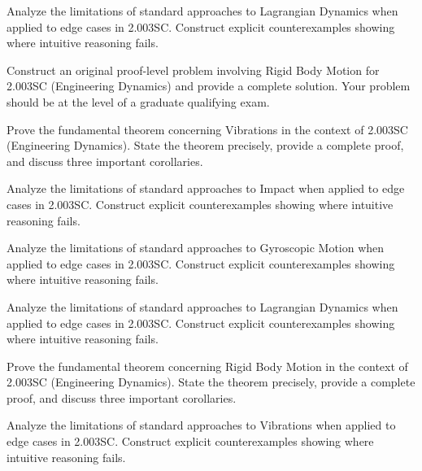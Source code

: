 \documentclass[12pt,a4paper]{exam}
\begin{document}
\begin{questions}

\question[5]
Analyze the limitations of standard approaches to Lagrangian Dynamics when applied to edge cases in 2.003SC. Construct explicit counterexamples showing where intuitive reasoning fails.

\vspace{0.3cm}

\question[5]
Construct an original proof-level problem involving Rigid Body Motion for 2.003SC (Engineering Dynamics) and provide a complete solution. Your problem should be at the level of a graduate qualifying exam.

\vspace{0.3cm}

\question[3]
Prove the fundamental theorem concerning Vibrations in the context of 2.003SC (Engineering Dynamics). State the theorem precisely, provide a complete proof, and discuss three important corollaries.

\vspace{0.3cm}

\question[2]
Analyze the limitations of standard approaches to Impact when applied to edge cases in 2.003SC. Construct explicit counterexamples showing where intuitive reasoning fails.

\vspace{0.3cm}

\question[5]
Analyze the limitations of standard approaches to Gyroscopic Motion when applied to edge cases in 2.003SC. Construct explicit counterexamples showing where intuitive reasoning fails.

\vspace{0.3cm}

\question[3]
Analyze the limitations of standard approaches to Lagrangian Dynamics when applied to edge cases in 2.003SC. Construct explicit counterexamples showing where intuitive reasoning fails.

\vspace{0.3cm}

\question[2]
Prove the fundamental theorem concerning Rigid Body Motion in the context of 2.003SC (Engineering Dynamics). State the theorem precisely, provide a complete proof, and discuss three important corollaries.

\vspace{0.3cm}

\question[3]
Analyze the limitations of standard approaches to Vibrations when applied to edge cases in 2.003SC. Construct explicit counterexamples showing where intuitive reasoning fails.


\end{questions}
\end{document}
